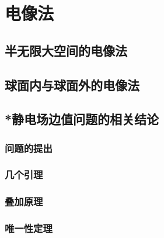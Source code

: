 

\section{电像法}\label{16-2}

\subsection{半无限大空间的电像法}\label{16-2-1}

\subsection{球面内与球面外的电像法}\label{16-2-2}

\subsection{*静电场边值问题的相关结论}\label{16-2-3}

\subsubsection{问题的提出}\label{16-2-3-1}

\subsubsection{几个引理}\label{16-2-3-2}

\subsubsection{叠加原理}\label{16-2-3-3}

\subsubsection{唯一性定理}\label{16-2-3-4}